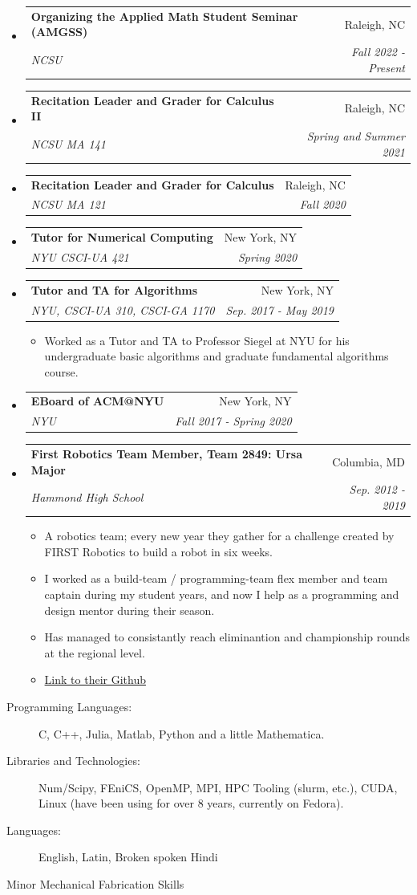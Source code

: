 \documentclass[letterpaper,11pt]{article}
\makeatletter
\newlength{\outerbordwidth}
\newcommand{\resitem}[1]{\item #1 \vspace{-2pt}}
\newcommand{\resheading}[1]{\vspace{8pt}
  \parbox{\textwidth}{\setlength{\FrameSep}{\outerbordwidth}
    \begin{shaded}

\setlength{\fboxsep}{0pt}\framebox[\textwidth][l]{\setlength{\fboxsep}{4pt}\fcolorbox{shadecolorB}{shadecolorB}{\textbf{\sffamily{\mbox{~}\makebox[6.762in][l]{\large #1} \vphantom{p\^{E}}}}}}
    \end{shaded}
  }\vspace{-5pt}
}
\newcommand{\ressubheading}[4]{
\begin{tabular*}{6.5in}{l@{\cftdotfill{\cftsecdotsep}\extracolsep{\fill}}r}
		\textbf{#1} & #2 \\
		\textit{#3} & \textit{#4} \\
\end{tabular*}\vspace{-6pt}}
\makeatother
\begin{document}
\begin{itemize}

\item 
	\ressubheading{Organizing the Applied Math Student Seminar (AMGSS)}{Raleigh, NC}{NCSU}{Fall 2022 - Present}

\item
	\ressubheading{Recitation Leader and Grader for Calculus II}{Raleigh, NC}{NCSU MA 141}{Spring and Summer 2021}

\item
	\ressubheading{Recitation Leader and Grader for Calculus}{Raleigh, NC}{NCSU MA 121}{Fall 2020}

\item
	\ressubheading{Tutor for Numerical Computing}{New York, NY}{NYU CSCI-UA 421}{Spring 2020}

\item
	\ressubheading{Tutor and TA for Algorithms}{New York, NY}{NYU, CSCI-UA 310,
	CSCI-GA 1170 }{Sep. 2017 - May 2019}
	\begin{itemize}
		\resitem{
      Worked as a Tutor and TA to Professor Siegel at NYU for his undergraduate
      basic algorithms and graduate fundamental algorithms course.
    }
	\end{itemize}

\item 
	\ressubheading{EBoard of ACM@NYU}{New York, NY}{NYU}{Fall 2017 - Spring 2020}

\item
	\ressubheading{First Robotics Team Member, Team 2849: Ursa Major}{Columbia, MD}{Hammond High
    School}{Sep. 2012 - 2019}
	\begin{itemize}
		\resitem{A robotics team; every new year they gather for a challenge
        created by FIRST Robotics to build a robot in six weeks.}
        \resitem{I worked as a build-team / programming-team flex member and
        team captain during my student years, and now I help as a programming
        and design mentor during their season.}
        \resitem{Has managed to consistantly reach eliminantion and championship
        rounds at the regional level.}
        \resitem{\href{https://github.com/teamursamajor}{Link to their Github}}
	\end{itemize}
\end{itemize}

\resheading{Skills}

\begin{description}
\item[Programming Languages:]
C, C++, Julia, Matlab, Python and a little Mathematica.
\item[Libraries and Technologies:]
  Num/Scipy, FEniCS, OpenMP, MPI, HPC Tooling (slurm, etc.), CUDA, Linux (have
  been using for over 8 years, currently on Fedora).
\item[Languages:]
English, Latin, Broken spoken Hindi
\item[Minor Mechanical Fabrication Skills]
\end{description}
\end{document}
